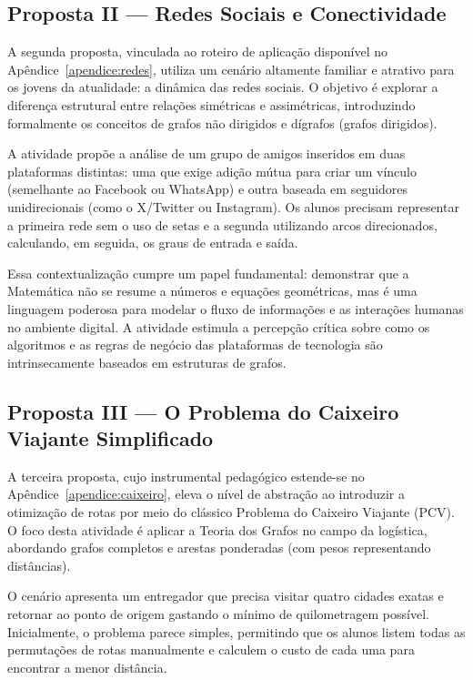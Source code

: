 \documentclass[
  12pt,
  oneside,
  a4paper,
  english,
  brazilian
  ]{abntex2}
\theoremstyle{definition}
\begin{document}
\subsection{Proposta II --- Redes Sociais e Conectividade}
\label{sub:proposta_redes}

A segunda proposta, vinculada ao roteiro de aplicação disponível no Apêndice~\ref{apendice:redes}, utiliza um cenário altamente familiar e atrativo para os jovens da atualidade: a dinâmica das redes sociais. O objetivo é explorar a diferença estrutural entre relações simétricas e assimétricas, introduzindo formalmente os conceitos de grafos não dirigidos e dígrafos (grafos dirigidos).

A atividade propõe a análise de um grupo de amigos inseridos em duas plataformas distintas: uma que exige adição mútua para criar um vínculo (semelhante ao Facebook ou WhatsApp) e outra baseada em seguidores unidirecionais (como o X/Twitter ou Instagram). Os alunos precisam representar a primeira rede sem o uso de setas e a segunda utilizando arcos direcionados, calculando, em seguida, os graus de entrada e saída.

Essa contextualização cumpre um papel fundamental: demonstrar que a Matemática não se resume a números e equações geométricas, mas é uma linguagem poderosa para modelar o fluxo de informações e as interações humanas no ambiente digital. A atividade estimula a percepção crítica sobre como os algoritmos e as regras de negócio das plataformas de tecnologia são intrinsecamente baseados em estruturas de grafos.

\subsection{Proposta III --- O Problema do Caixeiro Viajante Simplificado}
\label{sub:proposta_caixeiro} 

A terceira proposta, cujo instrumental pedagógico estende-se no Apêndice~\ref{apendice:caixeiro}, eleva o nível de abstração ao introduzir a otimização de rotas por meio do clássico Problema do Caixeiro Viajante (PCV). O foco desta atividade é aplicar a Teoria dos Grafos no campo da logística, abordando grafos completos e arestas ponderadas (com pesos representando distâncias).

O cenário apresenta um entregador que precisa visitar quatro cidades exatas e retornar ao ponto de origem gastando o mínimo de quilometragem possível. Inicialmente, o problema parece simples, permitindo que os alunos listem todas as permutações de rotas manualmente e calculem o custo de cada uma para encontrar a menor distância.
\end{document}
